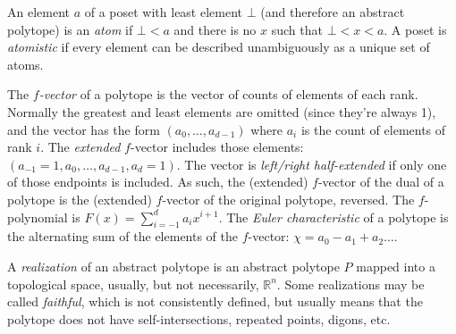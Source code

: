 \documentclass{amsart}[12pt]
\begin{document}
An element $a$ of a poset with least element $\bot$ (and therefore an abstract
polytope) is an \textit{atom} if $\bot < a$ and there is no $x$ such that
$\bot < x < a$. A poset is \textit{atomistic} if every
element can be described unambiguously as a unique set of atoms.

The $f$\textit{-vector} of a polytope is the vector of counts of elements of
each rank. Normally the greatest and least elements are omitted (since they're
always 1), and the vector has the form $(a_0, \ldots, a_{d-1})$ where $a_i$ is
the count of elements of rank $i$. The \textit{extended} $f$-vector includes
those elements: $(a_{-1}=1, a_0, \ldots, a_{d-1}, a_d=1)$. The vector is
\textit{left/right half-extended} if only one of those endpoints is included.
As such, the (extended) $f$-vector of the dual of a polytope is the (extended)
$f$-vector of the original polytope, reversed. The $f$-polynomial is
$F(x) = \sum_{i=-1}^d a_i x^{i+1}$. The \textit{Euler characteristic} of a
polytope is the alternating sum of the elements of the $f$-vector:
$\chi = a_0 - a_1 + a_2 \ldots$.

A \textit{realization} of an abstract polytope is an abstract polytope $P$
mapped into a topological space, usually, but not necessarily, $\mathbb{R}^n$.
Some realizations may be called \textit{faithful}, which is not consistently
defined, but usually means that the polytope does not have self-intersections,
repeated points, digons, etc.
\end{document}
